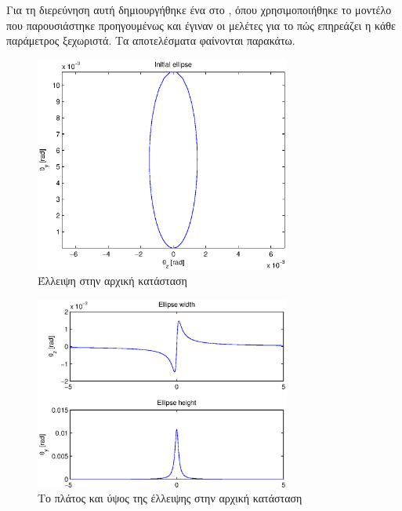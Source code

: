 Για τη διερεύνηση αυτή δημιουργήθηκε ένα  στο , όπου χρησιμοποιήθηκε το μοντέλο που παρουσιάστηκε προηγουμένως και έγιναν οι μελέτες για το πώς επηρεάζει η κάθε παράμετρος ξεχωριστά. 
Τα αποτελέσματα φαίνονται παρακάτω.

\begin{figure}[tbh]
\includegraphics[width=0.75\textwidth]{figures/beam_deflection_script_01_initial_elipse}
\centering
\caption{Έλλειψη στην αρχική κατάσταση}
\label{fig:beam_deflection_script_01_initial_elipse}
\end{figure}

\begin{figure}[tbh]
\includegraphics[width=0.75\textwidth]{figures/beam_deflection_script_02_elipse_width}
\centering
\caption{Το πλάτος και ύψος της έλλειψης στην αρχική κατάσταση}
\label{fig:beam_deflection_script_02_elipse_width}
\end{figure}

